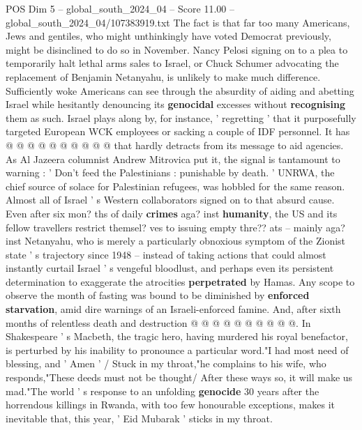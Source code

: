 \begin{textsample}{POS Dim 5 – global\_south\_2024\_04 – Score 11.00 – global\_south\_2024\_04/107383919.txt}
The fact is that far too many Americans, Jews and gentiles, who might unthinkingly have voted Democrat previously, might be disinclined to do so in November.
Nancy Pelosi signing on to a plea to temporarily halt lethal arms sales to Israel, or Chuck Schumer advocating the replacement of Benjamin Netanyahu, is unlikely to make much difference.
Sufficiently woke Americans can see through the absurdity of aiding and abetting Israel while hesitantly denouncing its \textbf{genocidal} excesses without \textbf{recognising} them as such.
Israel plays along by, for instance, ' regretting ' that it purposefully targeted European WCK employees or sacking a couple of IDF personnel.
It has @ @ @ @ @ @ @ @ @ @ that hardly detracts from its message to aid agencies.
As Al Jazeera columnist Andrew Mitrovica put it, the signal is tantamount to warning : ' Don't feed the Palestinians : punishable by death. ' UNRWA, the chief source of solace for Palestinian refugees, was hobbled for the same reason.
Almost all of Israel ' s Western collaborators signed on to that absurd cause.
Even after six mon? ths of daily \textbf{crimes} aga? inst \textbf{humanity}, the US and its fellow travellers restrict themsel? ves to issuing empty thre?? ats -- mainly aga? inst Netanyahu, who is merely a particularly obnoxious symptom of the Zionist state ' s trajectory since 1948 -- instead of taking actions that could almost instantly curtail Israel ' s vengeful bloodlust, and perhaps even its persistent determination to exaggerate the atrocities \textbf{perpetrated} by Hamas.
Any scope to observe the month of fasting was bound to be diminished by \textbf{enforced} \textbf{starvation}, amid dire warnings of an Israeli-enforced famine.
And, after sixth months of relentless death and destruction @ @ @ @ @ @ @ @ @ @.
In Shakespeare ' s Macbeth, the tragic hero, having murdered his royal benefactor, is perturbed by his inability to pronounce a particular word."I had most need of blessing, and ' Amen ' / Stuck in my throat,"he complains to his wife, who responds,"These deeds must not be thought/ After these ways so, it will make us mad."The world ' s response to an unfolding \textbf{genocide} 30 years after the horrendous killings in Rwanda, with too few honourable exceptions, makes it inevitable that, this year, ' Eid Mubarak ' sticks in my throat.

\end{textsample}
